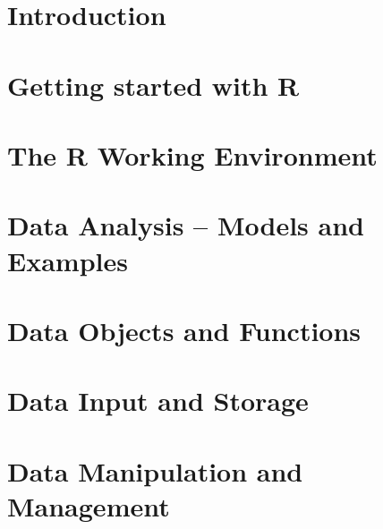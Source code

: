 \documentclass{tufte-book}\usepackage[]{graphicx}\usepackage[]{color}
\begin{document}



\cleardoublepage
\chapter*{Introduction}


\mainmatter
\setcounter{secnumdepth}{2}
\setcounter{tocdepth}{2}

\chapter{Getting started with R}\label{ch:getStart}



\chapter{The R Working Environment}\label{ch:workenv}


\chapter{Data Analysis -- Models and Examples}\label{ch:worked}


\chapter{Data Objects and Functions}



\chapter{Data Input and Storage}\label{ch:input}


\chapter{Data Manipulation and Management}\label{ch:manip}

\end{document}
